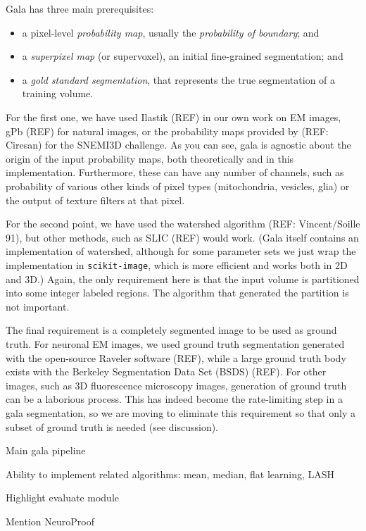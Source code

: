 \documentclass{frontiersSCNS} %
\begin{document}
Gala has three main prerequisites:
\begin{itemize}
\item a pixel-level \emph{probability map}, usually the \emph{probability of boundary}; and
\item a \emph{superpixel map} (or supervoxel), an initial fine-grained segmentation; and
\item a \emph{gold standard segmentation}, that represents the true segmentation of a training volume.
\end{itemize}

For the first one, we have used Ilastik (REF) in our own work on EM images, gPb (REF) for natural images, or the probability maps provided by (REF: Ciresan) for the SNEMI3D challenge.
As you can see, gala is agnostic about the origin of the input probability maps, both theoretically and in this implementation.
Furthermore, these can have any number of channels, such as probability of various other kinds of pixel types (mitochondria, vesicles, glia) or the output of texture filters at that pixel.

For the second point, we have used the watershed algorithm (REF: Vincent/Soille 91), but other methods, such as SLIC (REF) would work.
(Gala itself contains an implementation of watershed, although for some parameter sets we just wrap the implementation in \texttt{scikit-image}, which is more efficient and works both in 2D and 3D.)
Again, the only requirement here is that the input volume is partitioned into some integer labeled regions.
The algorithm that generated the partition is not important.

The final requirement is a completely segmented image to be used as ground truth.
For neuronal EM images, we used ground truth segmentation generated with the open-source Raveler software (REF), while a large ground truth body exists with the Berkeley Segmentation Data Set (BSDS) (REF).
For other images, such as 3D fluorescence microscopy images, generation of ground truth can be a laborious process.
This has indeed become the rate-limiting step in a gala segmentation, so we are moving to eliminate this requirement so that only a subset of ground truth is needed (see discussion).


Main gala pipeline

Ability to implement related algorithms: mean, median, flat learning, LASH

Highlight evaluate module

Mention NeuroProof
\end{document}
